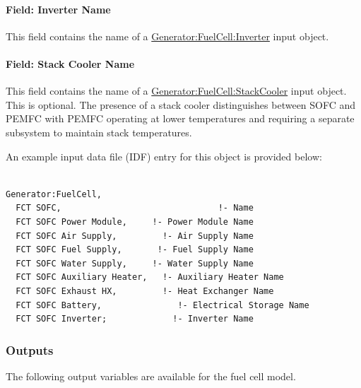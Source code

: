 \paragraph{Field: Inverter Name}\label{field-inverter-name}

This field contains the name of a \hyperref[generatorfuelcellinverter]{Generator:FuelCell:Inverter} input object.

\paragraph{Field: Stack Cooler Name}\label{field-stack-cooler-name}

This field contains the name of a \hyperref[generatorfuelcellstackcooler]{Generator:FuelCell:StackCooler} input object. This is optional. The presence of a stack cooler distinguishes between SOFC and PEMFC with PEMFC operating at lower temperatures and requiring a separate subsystem to maintain stack temperatures.

An example input data file (IDF) entry for this object is provided below:

\begin{lstlisting}

Generator:FuelCell,
  FCT SOFC,                               !- Name
  FCT SOFC Power Module,     !- Power Module Name
  FCT SOFC Air Supply,         !- Air Supply Name
  FCT SOFC Fuel Supply,       !- Fuel Supply Name
  FCT SOFC Water Supply,     !- Water Supply Name
  FCT SOFC Auxiliary Heater,   !- Auxiliary Heater Name
  FCT SOFC Exhaust HX,         !- Heat Exchanger Name
  FCT SOFC Battery,               !- Electrical Storage Name
  FCT SOFC Inverter;             !- Inverter Name
\end{lstlisting}

\subsubsection{Outputs}\label{outputs-9-001}

The following output variables are available for the fuel cell model.

